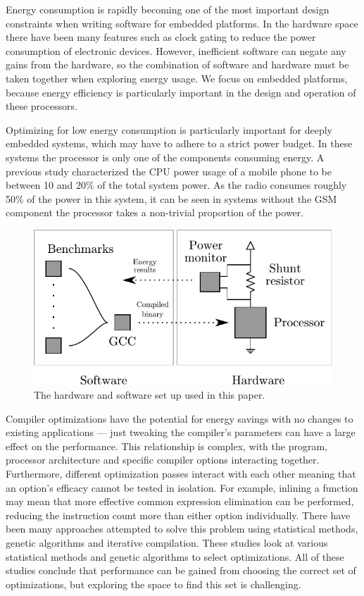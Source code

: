 \documentclass[twocolumn]{article}
\let\oldcaption\caption
\renewcommand{\caption}[1]{\oldcaption{\textup{#1}}}
\begin{document}
Energy consumption is rapidly becoming one of the most important design constraints when writing software for embedded platforms. In the hardware space there have been many features such as clock gating to reduce the power consumption of electronic devices. However, inefficient software can negate any gains from the hardware, so the combination of software and hardware must be taken together when exploring energy usage. We focus on embedded platforms, because energy efficiency is particularly important in the design and operation of these processors.

Optimizing for low energy consumption is particularly important for deeply embedded systems, which may have to adhere to a strict power budget. In these systems the processor is only one of the components consuming energy. A previous study characterized the CPU power usage of a mobile phone to be between 10 and 20\% of the total system power\cite{SmartPhonePower}. As the radio consumes roughly 50\% of the power in this system, it can be seen in systems without the GSM component the processor takes a non-trivial proportion of the power.

\begin{figure}[b!]
	\includegraphics[width=\linewidth]{diagram.pdf}
	\caption{The hardware and software set up used in this paper.}
	\label{Fig:setup}
\end{figure}

Compiler optimizations have the potential for energy savings with no changes to existing applications --- just tweaking the compiler's parameters can have a large effect on the performance. This relationship is complex, with the program, processor architecture and specific compiler options interacting together. Furthermore, different optimization passes interact with each other meaning that an option's efficacy cannot be tested in isolation. For example, inlining a function may mean that more effective common expression elimination can be performed, reducing the instruction count more than either option individually. There have been many approaches attempted to solve this problem using statistical methods\cite{Haneda2005}, genetic algorithms\cite{Lin2008} and iterative compilation\cite{Kisuki1999}. These studies look at various statistical methods and genetic algorithms to select optimizations. All of these studies conclude that performance can be gained from choosing the correct set of optimizations, but exploring the space to find this set is challenging.
\end{document}
